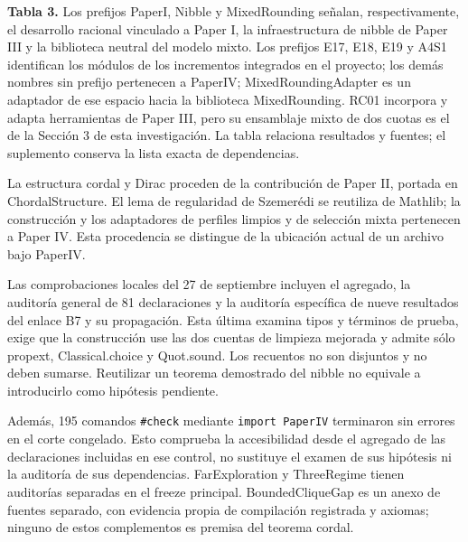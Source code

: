\documentclass[spanish,11pt,a4paper]{article}
\begin{document}
\textbf{Tabla 3.} Los prefijos {\ttfamily\small PaperI}, {\ttfamily\small Nibble} y {\ttfamily\small MixedRoundin\discretionary{\hbox{\ensuremath{\hookrightarrow}}}{}{}g} señalan, respectivamente, el desarrollo racional vinculado a Paper I, la infraestructura de nibble de Paper III y la biblioteca neutral del modelo mixto. Los prefijos {\ttfamily\small E17}, {\ttfamily\small E18}, {\ttfamily\small E19} y {\ttfamily\small A4S1} identifican los módulos de los incrementos integrados en el proyecto; los demás nombres sin prefijo pertenecen a {\ttfamily\small PaperIV}; {\ttfamily\small MixedRoundin\discretionary{\hbox{\ensuremath{\hookrightarrow}}}{}{}gAdapter} es un adaptador de ese espacio hacia la biblioteca {\ttfamily\small MixedRoundin\discretionary{\hbox{\ensuremath{\hookrightarrow}}}{}{}g}. RC01 incorpora y adapta herramientas de Paper III, pero su ensamblaje mixto de dos cuotas es el de la Sección 3 de esta investigación. La tabla relaciona resultados y fuentes; el suplemento conserva la lista exacta de dependencias.

La estructura cordal y Dirac proceden de la contribución de Paper II, portada en {\ttfamily\small ChordalStruc\discretionary{\hbox{\ensuremath{\hookrightarrow}}}{}{}ture}. El lema de regularidad de Szemerédi se reutiliza de Mathlib; la construcción y los adaptadores de perfiles limpios y de selección mixta pertenecen a Paper IV. Esta procedencia se distingue de la ubicación actual de un archivo bajo {\ttfamily\small PaperIV}.

Las comprobaciones locales del 27 de septiembre incluyen el agregado, la auditoría general de 81 declaraciones y la auditoría específica de nueve resultados del enlace B7 y su propagación. Esta última examina tipos y términos de prueba, exige que la construcción use las dos cuentas de limpieza mejorada y admite sólo {\ttfamily\small propext}, {\ttfamily\small Classical.\discretionary{\hbox{\ensuremath{\hookrightarrow}}}{}{}choice} y {\ttfamily\small Quot.\discretionary{\hbox{\ensuremath{\hookrightarrow}}}{}{}sound}. Los recuentos no son disjuntos y no deben sumarse. Reutilizar un teorema demostrado del nibble no equivale a introducirlo como hipótesis pendiente.

Además, 195 comandos \nolinkurl{\#check} mediante \texttt{import\ PaperIV} terminaron sin errores en el corte congelado. Esto comprueba la accesibilidad desde el agregado de las declaraciones incluidas en ese control, no sustituye el examen de sus hipótesis ni la auditoría de sus dependencias. {\ttfamily\small FarExplorati\discretionary{\hbox{\ensuremath{\hookrightarrow}}}{}{}on} y {\ttfamily\small ThreeRegime} tienen auditorías separadas en el freeze principal. {\ttfamily\small BoundedCliqu\discretionary{\hbox{\ensuremath{\hookrightarrow}}}{}{}eGap} es un anexo de fuentes separado, con evidencia propia de compilación registrada y axiomas; ninguno de estos complementos es premisa del teorema cordal.
\end{document}
